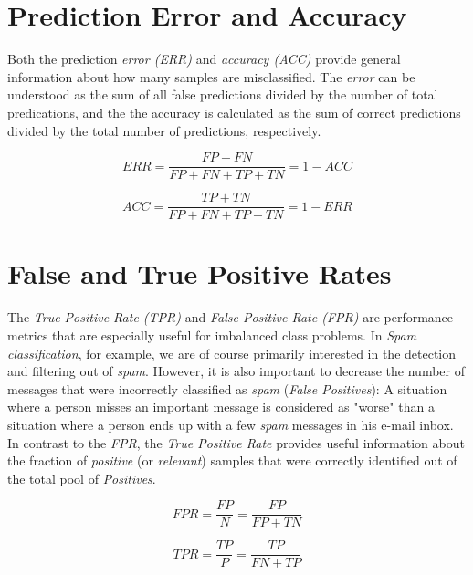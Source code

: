 \documentclass{article}
\begin{document}
\section{Prediction Error and Accuracy}

Both the prediction \emph{error (ERR)} and \emph{accuracy (ACC)} provide general information about how many samples are misclassified. The \emph{error} can be understood as the sum of all false predictions divided by the number of total predications, and the the accuracy is calculated as the sum of correct predictions divided by the total number of predictions, respectively.

\begin{equation} ERR = \frac{FP + FN}{FP+ FN + TP + TN} = 1-ACC\end{equation}

\begin{equation} ACC = \frac{TP + TN}{FP+ FN + TP + TN} = 1-ERR\end{equation}




\section{False and True Positive Rates}

The \emph{True Positive Rate (TPR)} and \emph{False Positive Rate (FPR)} are performance metrics that are especially useful for imbalanced class problems. In \emph{Spam classification}, for example, we are of course primarily interested in the detection and filtering out of \emph{spam}. However, it is also important to decrease the number of messages that were incorrectly classified as \emph{spam} (\emph{False Positives}): A situation where a person misses an important message is considered as "worse" than a situation where a person ends up with a few \emph{spam} messages in his e-mail inbox. In contrast to the \emph{FPR}, the \emph{True Positive Rate} provides useful information about the fraction of \emph{positive} (or \emph{relevant}) samples that were correctly identified out of the total pool of \emph{Positives}.

\begin{equation} FPR = \frac{FP}{N} =  \frac{FP}{FP + TN} \end{equation}

\begin{equation} TPR = \frac{TP}{P} =  \frac{TP}{FN + TP} \end{equation}
\end{document}
